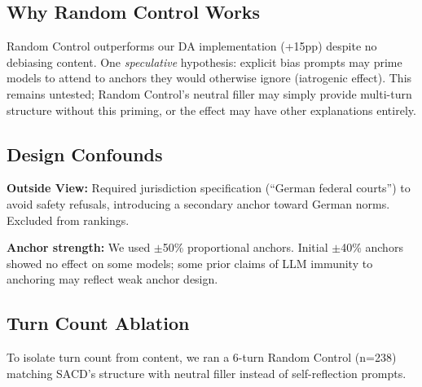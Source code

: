 \documentclass[11pt]{article}
\begin{document}
\subsection{Why Random Control Works}

Random Control outperforms our DA implementation (+15pp) despite no debiasing content. One \textit{speculative} hypothesis: explicit bias prompts may prime models to attend to anchors they would otherwise ignore (iatrogenic effect). This remains untested; Random Control's neutral filler may simply provide multi-turn structure without this priming, or the effect may have other explanations entirely.

\subsection{Design Confounds}
\label{sec:outside-view-confound}

\textbf{Outside View:} Required jurisdiction specification (``German federal courts'') to avoid safety refusals, introducing a secondary anchor toward German norms. Excluded from rankings.

\textbf{Anchor strength:} We used $\pm$50\% proportional anchors. Initial $\pm$40\% anchors showed no effect on some models; some prior claims of LLM immunity to anchoring may reflect weak anchor design.

\subsection{Turn Count Ablation}
\label{sec:6turn-rc}

To isolate turn count from content, we ran a 6-turn Random Control (n=238) matching SACD's structure with neutral filler instead of self-reflection prompts.
\end{document}
